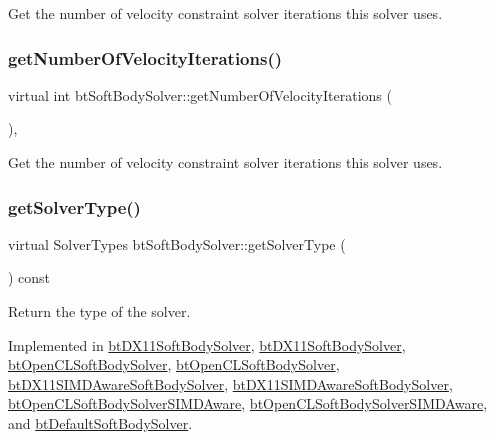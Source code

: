 Get the number of velocity constraint solver iterations this solver uses. \mbox{\label{classbtSoftBodySolver_a19a6754913540e92a387ffa5dbb2d29c}} 
\subsubsection{\texorpdfstring{get\+Number\+Of\+Velocity\+Iterations()}{getNumberOfVelocityIterations()}}
{\footnotesize\ttfamily virtual int bt\+Soft\+Body\+Solver\+::get\+Number\+Of\+Velocity\+Iterations (\begin{DoxyParamCaption}{ }\end{DoxyParamCaption})\hspace{0.3cm}{\ttfamily [inline]}, {\ttfamily [virtual]}}

Get the number of velocity constraint solver iterations this solver uses. \mbox{\label{classbtSoftBodySolver_aa08308ddb8e4661ab3c3e23cf3da647c}} 
\subsubsection{\texorpdfstring{get\+Solver\+Type()}{getSolverType()}}
{\footnotesize\ttfamily virtual Solver\+Types bt\+Soft\+Body\+Solver\+::get\+Solver\+Type (\begin{DoxyParamCaption}{ }\end{DoxyParamCaption}) const\hspace{0.3cm}{\ttfamily [pure virtual]}}

Return the type of the solver. 

Implemented in \hyperlink{classbtDX11SoftBodySolver_a1142bb4f735d275f161f003f7d703768}{bt\+D\+X11\+Soft\+Body\+Solver}, \hyperlink{classbtDX11SoftBodySolver_a1142bb4f735d275f161f003f7d703768}{bt\+D\+X11\+Soft\+Body\+Solver}, \hyperlink{classbtOpenCLSoftBodySolver_a2b643547caacc5c1daedff3f67a140fb}{bt\+Open\+C\+L\+Soft\+Body\+Solver}, \hyperlink{classbtOpenCLSoftBodySolver_a2b643547caacc5c1daedff3f67a140fb}{bt\+Open\+C\+L\+Soft\+Body\+Solver}, \hyperlink{classbtDX11SIMDAwareSoftBodySolver_ad36369c7c58e1cb8ddea7ebd54612eb9}{bt\+D\+X11\+S\+I\+M\+D\+Aware\+Soft\+Body\+Solver}, \hyperlink{classbtDX11SIMDAwareSoftBodySolver_ad36369c7c58e1cb8ddea7ebd54612eb9}{bt\+D\+X11\+S\+I\+M\+D\+Aware\+Soft\+Body\+Solver}, \hyperlink{classbtOpenCLSoftBodySolverSIMDAware_a34d8e98c8756aeeac24554c18f06c0c1}{bt\+Open\+C\+L\+Soft\+Body\+Solver\+S\+I\+M\+D\+Aware}, \hyperlink{classbtOpenCLSoftBodySolverSIMDAware_a34d8e98c8756aeeac24554c18f06c0c1}{bt\+Open\+C\+L\+Soft\+Body\+Solver\+S\+I\+M\+D\+Aware}, and \hyperlink{classbtDefaultSoftBodySolver_a8c7939edfff8dccf71e3eba0f80e9abe}{bt\+Default\+Soft\+Body\+Solver}.

